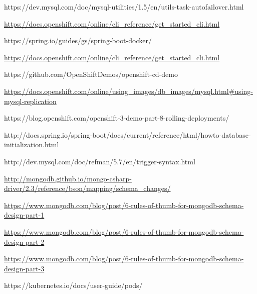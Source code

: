 https://dev.mysql.com/doc/mysql-utilities/1.5/en/utils-task-autofailover.html

\url{https://docs.openshift.com/online/cli_reference/get_started_cli.html}

https://spring.io/guides/gs/spring-boot-docker/

\url{https://docs.openshift.com/online/cli_reference/get_started_cli.html}

https://github.com/OpenShiftDemos/openshift-cd-demo

\url{https://docs.openshift.com/online/using_images/db_images/mysql.html#using-mysql-replication}

https://blog.openshift.com/openshift-3-demo-part-8-rolling-deployments/

http://docs.spring.io/spring-boot/docs/current/reference/html/howto-database-initialization.html

http://dev.mysql.com/doc/refman/5.7/en/trigger-syntax.html

\url{http://mongodb.github.io/mongo-csharp-driver/2.3/reference/bson/mapping/schema_changes/}

\url{https://www.mongodb.com/blog/post/6-rules-of-thumb-for-mongodb-schema-design-part-1}

\url{https://www.mongodb.com/blog/post/6-rules-of-thumb-for-mongodb-schema-design-part-2}

\url{https://www.mongodb.com/blog/post/6-rules-of-thumb-for-mongodb-schema-design-part-3}

https://kubernetes.io/docs/user-guide/pods/









